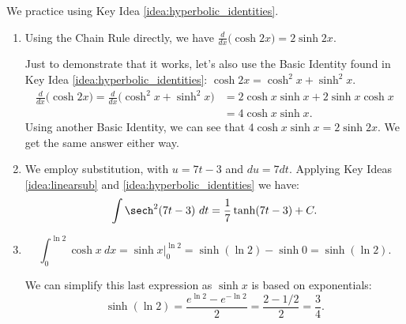 We practice using Key Idea \ref{idea:hyperbolic_identities}.\\

{\begin{enumerate}
\item		Using the Chain Rule directly, we have $\frac{d}{dx} \big(\cosh 2x\big) = 2\sinh 2x$.

Just to demonstrate that it works, let's also use the Basic Identity found in Key Idea \ref{idea:hyperbolic_identities}: $\cosh 2x = \cosh^2x+\sinh^2x$.
\begin{align*}\frac{d}{dx}\big(\cosh 2x\big) = \frac{d}{dx}\big(\cosh^2x+\sinh^2x\big) &= 2\cosh x\sinh x+ 2\sinh x\cosh x\\ &= 4\cosh x\sinh x.
\end{align*}
Using another Basic Identity, we can see that $4\cosh x\sinh x = 2\sinh 2x$. We get the same answer either way.

\item	  We employ substitution, with $u = 7t-3$ and $du = 7dt$. Applying Key Ideas \ref{idea:linearsub}  and \ref{idea:hyperbolic_identities} we have:
\[
 \int \sech^2 (7t-3)\ dt = \frac17\tanh (7t-3) + C.
\]

\item		\[
			\int_0^{\ln 2} \cosh x\ dx = \sinh x\Big|_0^{\ln 2} = \sinh (\ln 2) - \sinh 0 = \sinh(\ln 2).
			\]

We can simplify this last expression as $\sinh x$ is based on exponentials:
\[
\sinh(\ln 2) = \frac{e^{\ln 2}-e^{-\ln 2}}2 = \frac{2-1/2}{2} = \frac34.
\]
\end{enumerate}
\baselineskip
}\pagebreak

